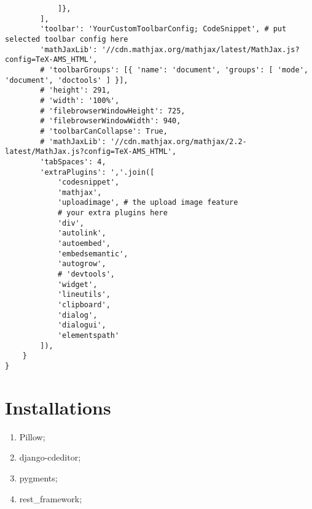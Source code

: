 \documentclass[12pt,a4paper]{article}
\begin{document}
{\begin{verbatim}
            ]},
        ],
        'toolbar': 'YourCustomToolbarConfig; CodeSnippet', # put selected toolbar config here
        'mathJaxLib': '//cdn.mathjax.org/mathjax/latest/MathJax.js?config=TeX-AMS_HTML',
        # 'toolbarGroups': [{ 'name': 'document', 'groups': [ 'mode', 'document', 'doctools' ] }],
        # 'height': 291,
        # 'width': '100%',
        # 'filebrowserWindowHeight': 725,
        # 'filebrowserWindowWidth': 940,
        # 'toolbarCanCollapse': True,
        # 'mathJaxLib': '//cdn.mathjax.org/mathjax/2.2-latest/MathJax.js?config=TeX-AMS_HTML',
        'tabSpaces': 4,
        'extraPlugins': ','.join([
            'codesnippet',
            'mathjax',
            'uploadimage', # the upload image feature
            # your extra plugins here
            'div',
            'autolink',
            'autoembed',
            'embedsemantic',
            'autogrow',
            # 'devtools',
            'widget',
            'lineutils',
            'clipboard',
            'dialog',
            'dialogui',
            'elementspath'
        ]),
    }
}
\end{verbatim}}

\section{Installations}
\begin{enumerate}
\item Pillow;
\item django-cdeditor;
\item pygments;
\item rest\_framework;
\end{enumerate}
\end{document}
